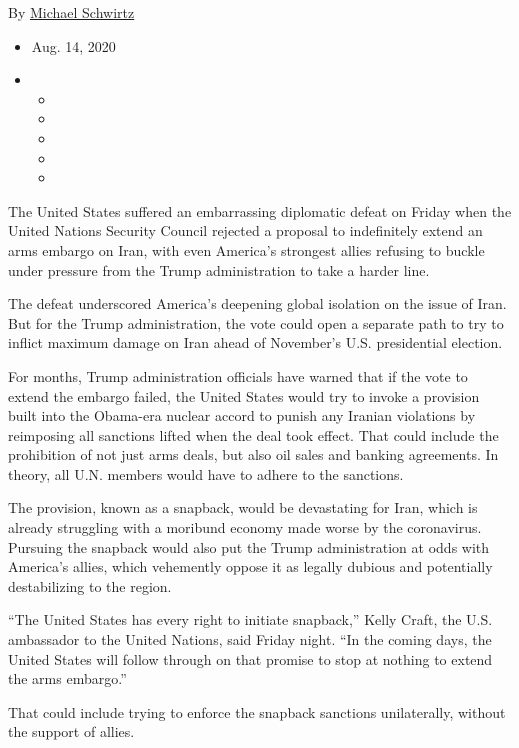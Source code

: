 By \href{https://www.nytimes3xbfgragh.onion/by/michael-schwirtz}{Michael
Schwirtz}

\begin{itemize}
\item
  Aug. 14, 2020
\item
  \begin{itemize}
  \item
  \item
  \item
  \item
  \item
  \end{itemize}
\end{itemize}

The United States suffered an embarrassing diplomatic defeat on Friday
when the United Nations Security Council rejected a proposal to
indefinitely extend an arms embargo on Iran, with even America's
strongest allies refusing to buckle under pressure from the Trump
administration to take a harder line.

The defeat underscored America's deepening global isolation on the issue
of Iran. But for the Trump administration, the vote could open a
separate path to try to inflict maximum damage on Iran ahead of
November's U.S. presidential election.

For months, Trump administration officials have warned that if the vote
to extend the embargo failed, the United States would try to invoke a
provision built into the Obama-era nuclear accord to punish any Iranian
violations by reimposing all sanctions lifted when the deal took effect.
That could include the prohibition of not just arms deals, but also oil
sales and banking agreements. In theory, all U.N. members would have to
adhere to the sanctions.

The provision, known as a snapback, would be devastating for Iran, which
is already struggling with a moribund economy made worse by the
coronavirus. Pursuing the snapback would also put the Trump
administration at odds with America's allies, which vehemently oppose it
as legally dubious and potentially destabilizing to the region.

``The United States has every right to initiate snapback,'' Kelly Craft,
the U.S. ambassador to the United Nations, said Friday night. ``In the
coming days, the United States will follow through on that promise to
stop at nothing to extend the arms embargo.''

That could include trying to enforce the snapback sanctions
unilaterally, without the support of allies.

